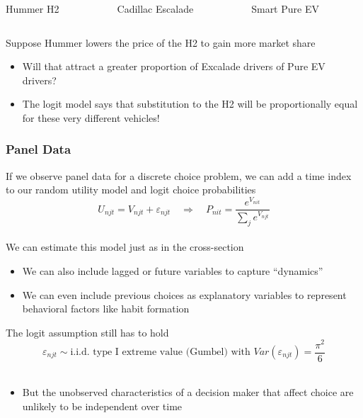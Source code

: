 \documentclass{beamer}
\begin{document}
\begin{frame}
\begin{columns}
\begin{column}{0.333\textwidth}
    	\end{column}
    \end{columns}
    \begin{columns}
    	\begin{column}{0.333\textwidth}
    		\centering Hummer H2
    	\end{column}
    	\begin{column}{0.333\textwidth}
    		\centering Cadillac Escalade
    	\end{column}
    	\begin{column}{0.333\textwidth}
    		\centering Smart Pure EV
    	\end{column}
    \end{columns}
    \vspace{3ex}
    Suppose Hummer lowers the price of the H2 to gain more market share
    \begin{itemize}
    	\item Will that attract a greater proportion of Excalade drivers of Pure EV drivers?
    	\item The logit model says that substitution to the H2 will be proportionally equal for these very different vehicles!
    \end{itemize}
\end{frame}

\begin{frame}\frametitle{Panel Data}
    If we observe panel data for a discrete choice problem, we can add a time index to our random utility model and logit choice probabilities
    $$U_{njt} = V_{njt} + \varepsilon_{njt} \quad \Rightarrow \quad P_{nit} = \frac{e^{V_{nit}}}{\sum_j e^{V_{njt}}}$$ \\
    \vspace{2ex}
    We can estimate this model just as in the cross-section
    \begin{itemize}
    	\item We can also include lagged or future variables to capture ``dynamics''
    	\item We can even include previous choices as explanatory variables to represent behavioral factors like habit formation
    \end{itemize}
    \vspace{2ex}
    The logit assumption still has to hold
    $$\varepsilon_{njt} \sim \text{i.i.d.\ type I extreme value (Gumbel) with } Var(\varepsilon_{njt}) = \frac{\pi^2}{6}$$ \\
    \begin{itemize}
    	\item But the unobserved characteristics of a decision maker that affect choice are unlikely to be independent over time
    \end{itemize}
\end{frame}
\end{document}
